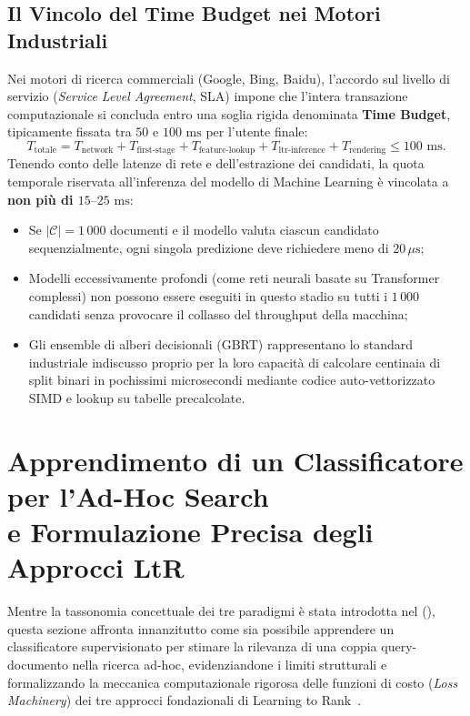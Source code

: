 \subsection{Il Vincolo del Time Budget nei Motori Industriali}
\label{subsec:vincolo-time-budget}
Nei motori di ricerca commerciali (Google, Bing, Baidu), l'accordo sul livello di servizio (\textit{Service Level Agreement}, SLA) impone che l'intera transazione computazionale si concluda entro una soglia rigida denominata \textbf{Time Budget}, tipicamente fissata tra $50$ e $100\text{ ms}$ per l'utente finale:
\begin{equation}
T_{\text{totale}} = T_{\text{network}} + T_{\text{first-stage}} + T_{\text{feature-lookup}} + T_{\text{ltr-inference}} + T_{\text{rendering}} \le 100\text{ ms}.
\end{equation}
Tenendo conto delle latenze di rete e dell'estrazione dei candidati, la quota temporale riservata all'inferenza del modello di Machine Learning \`e vincolata a \textbf{non pi\`u di $15\text{--}25\text{ ms}$}:
\begin{itemize}
    \item Se $|\mathcal{C}| = 1\,000$ documenti e il modello valuta ciascun candidato sequenzialmente, ogni singola predizione deve richiedere meno di $20\,\mu\text{s}$;
    \item Modelli eccessivamente profondi (come reti neurali basate su Transformer complessi) non possono essere eseguiti in questo stadio su tutti i $1\,000$ candidati senza provocare il collasso del throughput della macchina;
    \item Gli ensemble di alberi decisionali (GBRT) rappresentano lo standard industriale indiscusso proprio per la loro capacit\`a di calcolare centinaia di split binari in pochissimi microsecondi mediante codice auto-vettorizzato SIMD e lookup su tabelle precalcolate.
\end{itemize}

\FloatBarrier
\section[Classificatori per l'Ad-Hoc Search e Meccanica delle Loss LtR]{Apprendimento di un Classificatore per l'Ad-Hoc Search\\ e Formulazione Precisa degli Approcci LtR}
\label{sec:classificatore-adhoc-meccanica-loss}
\label{sec:formulazione-matematica-obiettivi}

Mentre la tassonomia concettuale dei tre paradigmi \`e stata introdotta nel  (), questa sezione affronta innanzitutto come sia possibile apprendere un classificatore supervisionato per stimare la rilevanza di una coppia query-documento nella ricerca ad-hoc, evidenziandone i limiti strutturali e formalizzando la meccanica computazionale rigorosa delle funzioni di costo (\textit{Loss Machinery}) dei tre approcci fondazionali di Learning to Rank~\cite{bruch2023}.

